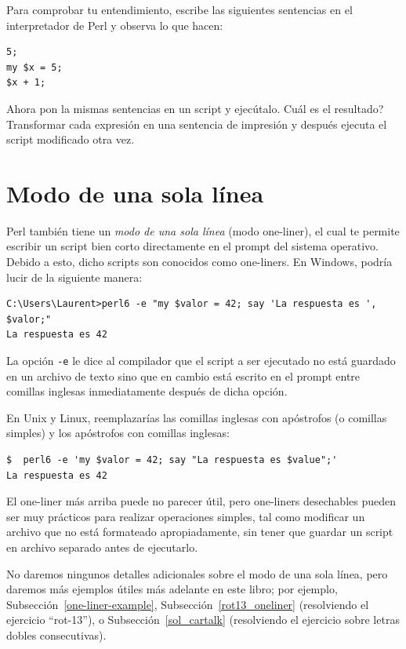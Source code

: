 Para comprobar tu entendimiento, escribe las siguientes sentencias
en el interpretador de Perl y observa lo que hacen:

\begin{lstlisting}
5;
my $x = 5;
$x + 1;
\end{lstlisting}

Ahora pon la mismas sentencias en un script y ejecútalo. 
Cuál es el resultado? Transformar cada expresión en una sentencia 
de impresión y después ejecuta el script modificado otra vez.

\section{Modo de una sola línea}

Perl también tiene un \emph{modo de una sola línea} (modo one-liner), el cual te permite 
escribir un script bien corto directamente en el prompt del sistema
operativo. Debido a esto, dicho scripts son conocidos como one-liners.
 En Windows, podría lucir de la siguiente manera:
\label{one-liner mode}

\begin{lstlisting}
C:\Users\Laurent>perl6 -e "my $valor = 42; say 'La respuesta es ', $valor;"
La respuesta es 42

\end{lstlisting}

La opción {\tt -e} le dice al compilador que el script
a ser ejecutado no está guardado en un archivo de texto sino
que en cambio está escrito en el prompt entre comillas inglesas
inmediatamente después de dicha opción.

En Unix y Linux, reemplazarías las comillas inglesas con apóstrofos
(o comillas simples)  y los apóstrofos con comillas inglesas:

\begin{lstlisting}
$  perl6 -e 'my $valor = 42; say "La respuesta es $value";'
La respuesta es 42

\end{lstlisting}

El one-liner más arriba puede no parecer útil, pero 
one-liners desechables pueden ser muy prácticos para realizar
operaciones simples, tal como modificar un archivo que no
está formateado apropiadamente, sin tener que guardar un script
en archivo separado antes de ejecutarlo.  

No daremos ningunos detalles adicionales sobre el modo 
de una sola línea, pero daremos más ejemplos útiles más
adelante en este libro; por ejemplo,
Subsección~\ref{one-liner-example},
Subsección~\ref{rot13_oneliner} (resolviendo el ejercicio ``rot-13''), o
Subsección~\ref{sol_cartalk} (resolviendo el ejercicio sobre 
letras dobles consecutivas). 



